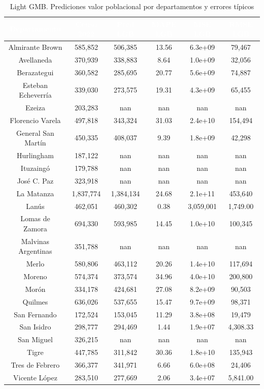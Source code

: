 \documentclass{article}
\theoremstyle{mytheoremstyle}
\theoremstyle{mytheoremstyle}
\theoremstyle{myproblemstyle}
\begin{document}
\begin{table}[htb!]
    \centering
    \begin{tabular}{|c|c|c|c|c|c|}
    \hline
    \textbf{\cellcolor[rgb]{0,0.231,0.427}\textcolor{white}{Departamento}} & \textbf{\cellcolor[rgb]{0,0.231,0.427}\textcolor{white}{Censo 2022}} & \textbf{\cellcolor[rgb]{0,0.231,0.427}\textcolor{white}{Pred LGB}} & \textbf{\cellcolor[rgb]{0,0.231,0.427}\textcolor{white}{MAPE LGB}} & \textbf{\cellcolor[rgb]{0,0.231,0.427}\textcolor{white}{MSE LGB}} & \textbf{\cellcolor[rgb]{0,0.231,0.427}\textcolor{white}{RMSE LGB}} \\ \hline
    Almirante Brown & 585,852 & 506,385 & 13.56 & 6.3e+09 & 79,467 \\
    Avellaneda & 370,939 & 338,883 & 8.64 & 1.0e+09 & 32,056 \\
    Berazategui & 360,582 & 285,695 & 20.77 & 5.6e+09 & 74,887 \\
    Esteban Echeverría & 339,030 & 273,575 & 19.31 & 4.3e+09 & 65,455 \\
    Ezeiza & 203,283 & nan & nan & nan & nan \\
    Florencio Varela & 497,818 & 343,324 & 31.03 & 2.4e+10 & 154,494 \\
    General San Martín & 450,335 & 408,037 & 9.39 & 1.8e+09 & 42,298 \\
    Hurlingham & 187,122 & nan & nan & nan & nan \\
    Ituzaingó & 179,788 & nan & nan & nan & nan \\
    José C. Paz & 323,918 & nan & nan & nan & nan \\
    La Matanza & 1,837,774 & 1,384,134 & 24.68 & 2.1e+11 & 453,640 \\
    Lanús & 462,051 & 460,302 & 0.38 & 3,059,001 & 1,749.00 \\
    Lomas de Zamora & 694,330 & 593,985 & 14.45 & 1.0e+10 & 100,345 \\
    Malvinas Argentinas & 351,788 & nan & nan & nan & nan \\
    Merlo & 580,806 & 463,112 & 20.26 & 1.4e+10 & 117,694 \\
    Moreno & 574,374 & 373,574 & 34.96 & 4.0e+10 & 200,800 \\
    Morón & 334,178 & 424,681 & 27.08 & 8.2e+09 & 90,503 \\
    Quilmes & 636,026 & 537,655 & 15.47 & 9.7e+09 & 98,371 \\
    San Fernando & 172,524 & 153,045 & 11.29 & 3.8e+08 & 19,479 \\
    San Isidro & 298,777 & 294,469 & 1.44 & 1.9e+07 & 4,308.33 \\
    San Miguel & 326,215 & nan & nan & nan & nan \\
    Tigre & 447,785 & 311,842 & 30.36 & 1.8e+10 & 135,943 \\
    Tres de Febrero & 366,377 & 341,971 & 6.66 & 6.0e+08 & 24,406 \\
    Vicente López & 283,510 & 277,669 & 2.06 & 3.4e+07 & 5,841.00 \\
    \hline
    \end{tabular}
    \caption{Light GMB. Prediciones valor poblacional por departamentos y errores típicos}
    \label{tab:LGBMResults}
\end{table}
\end{document}
